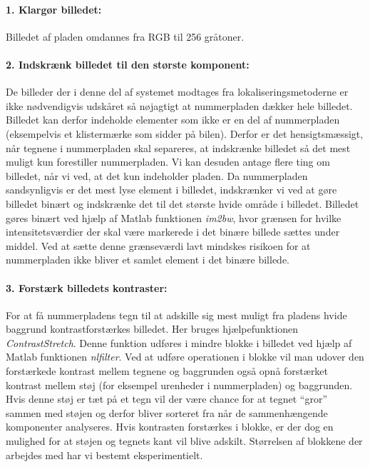 \paragraph{1. Klargør billedet:} Billedet af pladen omdannes fra RGB til 256 gråtoner.

\paragraph{2. Indskrænk billedet til den største komponent:}
De billeder der i denne del af systemet modtages fra lokaliseringsmetoderne er ikke nødvendigvis udskåret så nøjagtigt at nummerpladen dækker hele billedet. Billedet kan derfor indeholde elementer som ikke er en del af nummerpladen (eksempelvis et klistermærke som sidder på bilen). Derfor er det hensigtsmæssigt, når tegnene i nummerpladen skal separeres, at indskrænke billedet så det mest muligt kun forestiller nummerpladen. Vi kan desuden antage flere ting om billedet, når vi ved, at det kun indeholder pladen. Da nummerpladen sandsynligvis er det mest lyse element i billedet, indskrænker vi ved at gøre billedet binært og indskrænke det til det største hvide område i billedet. Billedet gøres binært ved hjælp af Matlab funktionen \textit{im2bw}, hvor grænsen for hvilke intensitetsværdier der skal være markerede i det binære billede sættes under middel. Ved at sætte denne grænseværdi lavt mindskes risikoen for at nummerpladen ikke bliver et samlet element i det binære billede.

\paragraph{3. Forstærk billedets kontraster:}
For at få nummerpladens tegn til at adskille sig mest muligt fra pladens hvide baggrund kontrastforstærkes billedet. Her bruges hjælpefunktionen \textit{ContrastStretch}. Denne funktion udføres i mindre blokke i billedet ved hjælp af Matlab funktionen \textit{nlfilter}. Ved at udføre operationen i blokke vil man udover den forstærkede kontrast mellem tegnene og baggrunden også opnå forstærket kontrast mellem støj (for eksempel urenheder i nummerpladen) og baggrunden. Hvis denne støj er tæt på et tegn vil der være chance for at tegnet ``gror'' sammen med støjen og derfor bliver sorteret fra når de sammenhængende komponenter analyseres. Hvis kontrasten forstærkes i blokke, er der dog en mulighed for at støjen og tegnets kant vil blive adskilt. Størrelsen af blokkene der arbejdes med har vi bestemt eksperimentielt.

